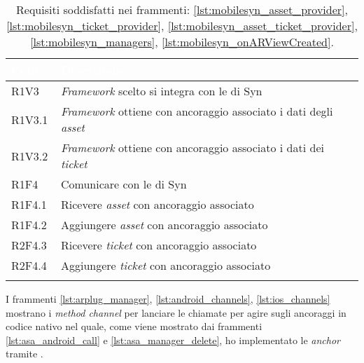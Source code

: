 {
    \setlength{\freewidth}{\dimexpr\textwidth-10\tabcolsep}
    \renewcommand{\arraystretch}{1.5}
    \centering
    \setlength{\aboverulesep}{0pt}
    \setlength{\belowrulesep}{0pt}
    \begin{longtable}{C{.15\freewidth} C{.965\freewidth}}
       \toprule
    \textcolor{white}{\textbf{Codice}}&
    \textcolor{white}{\textbf{Descrizione}}\\
    \toprule
    \endhead

    R1V3 & \textit{Framework} scelto si integra con le \api{} di Syn\\
    R1V3.1 & \textit{Framework} ottiene con ancoraggio associato i dati degli \textit{asset}\\
    R1V3.2 & \textit{Framework} ottiene con ancoraggio associato i dati dei \textit{ticket}\\ 
    R1F4 & Comunicare con le \api{} di Syn\\
    R1F4.1 & Ricevere \textit{asset} con ancoraggio associato\\
    R1F4.2 & Aggiungere \textit{asset} con ancoraggio associato\\
    R2F4.3 & Ricevere \textit{ticket} con ancoraggio associato\\
    R2F4.4 & Aggiungere \textit{ticket} con ancoraggio associato\\
  
    \bottomrule
    \caption{Requisiti soddisfatti nei frammenti: \ref{lst:mobilesyn_asset_provider}, \ref{lst:mobilesyn_ticket_provider}, \ref{lst:mobilesyn_asset_ticket_provider}, \ref{lst:mobilesyn_managers}, \ref{lst:mobilesyn_onARViewCreated}.}
    \end{longtable}
}

I frammenti \ref{lst:arplug_manager}, \ref{lst:android_channels}, \ref{lst:ios_channels} mostrano i \textit{method channel} per lanciare le chiamate per agire sugli ancoraggi in codice nativo nel quale, come viene mostrato dai frammenti \ref{lst:asa_android_call} e \ref{lst:asa_manager_delete}, ho implementato le \textit{anchor} tramite \asa{}.


